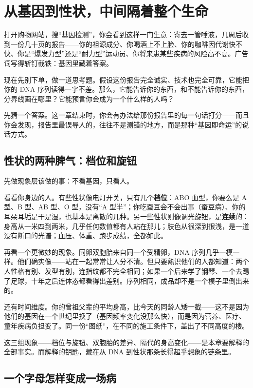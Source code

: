 \chapter{从基因到性状，中间隔着整个生命}

\begin{kaichang}
打开购物网站，搜“基因检测”，你会看到这样一门生意：寄去一管唾液，几周后收到一份几十页的报告——你的祖源成分、你喝酒上不上脸、你的咖啡因代谢快不快、你是“爆发力型”还是“耐力型”运动员、你将来患某些疾病的风险高不高。广告词写得斩钉截铁：基因里藏着答案。

现在先别下单，做一道思考题。假设这份报告完全诚实、技术也完全可靠，它能把你的 DNA 序列读得一字不差。那么，它能告诉你的东西，和不能告诉你的东西，分界线画在哪里？它能预言你会成为一个什么样的人吗？

先猜一个答案。这一章结束时，你会有办法给那份报告里的每一句话打分——而且你会发现，报告里最误导人的，往往不是测错的地方，而是那种“基因即命运”的说话方式。
\end{kaichang}

\section{性状的两种脾气：档位和旋钮}

先做现象层该做的事：不看基因，只看人。

看看你身边的人。有些性状像电灯开关，只有几个\textbf{档位}：ABO 血型，你要么是 A 型、B 型、AB 型、O 型，没有“A 型半”；你吃蚕豆会不会出事（蚕豆病）、你的耳朵耳垢是干是湿，也基本是离散的几种。另一些性状则像调光旋钮，是\textbf{连续}的：身高从一米四到两米，几乎任何数值都有人站在那儿；肤色从很深到很浅，是一道没有断口的光谱；血压、体重、跑步成绩，全都如此。

再看一个更微妙的现象。同卵双胞胎来自同一个受精卵，DNA 序列几乎一模一样。他们确实像——站在一起常常让人分不清。但只要熟识他们的人都知道：两个人性格有别、发型有别，连指纹都不完全相同；如果一个后来学了钢琴、一个去踢了足球，十年之后连体态都看得出差别。序列相同，成品却不是一个模子里倒出来的。

还有时间维度。你的曾祖父辈的平均身高，比今天的同龄人矮一截——这不是因为他们的基因在一个世纪里换了（基因频率变化没那么快），而是因为营养、医疗、童年疾病负担变了。同一份“图纸”，在不同的施工条件下，盖出了不同高度的楼。

这三组现象——档位与旋钮、双胞胎的差异、隔代的身高变化——是本章要解释的全部事实。而解释的钥匙，藏在从 DNA 到性状那条长得超乎想象的链条里。

\section{一个字母怎样变成一场病}

